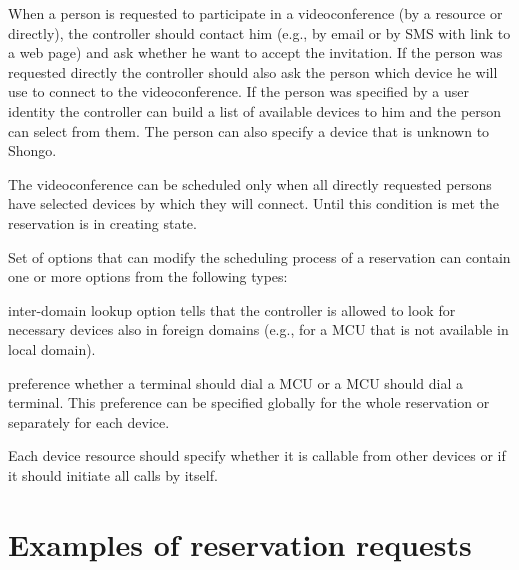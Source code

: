 When a person is requested to participate in a videoconference (by a resource or directly), the controller should contact him (e.g., by email or by SMS with link to a web page) and ask whether he want to accept the invitation. If the person was requested directly the controller should also ask the person which device he will use to connect to the videoconference. If the person was specified by a user identity the controller can build a list of available devices to him and the person can select from them. The person can also specify a device that is unknown to Shongo. 

The videoconference can be scheduled only when all directly requested persons have selected devices by which they will connect. Until this condition is met the reservation is in creating state.

Set of options that can modify the scheduling process of a reservation can contain one or more options from the following types:
\begin{compactitem}
\item inter-domain lookup option tells that the controller is allowed to look for necessary devices also in foreign domains (e.g., for a MCU that is not available in local domain).
\item preference whether a terminal should dial a MCU or a MCU should dial a terminal. This preference can be specified globally for the whole reservation or separately for each device.
\end{compactitem}
Each device resource should specify whether it is callable from other devices or if it should initiate all calls by itself.

\section{Examples of reservation requests}

\CodeStyleAppendImplementation
\CodeStyleAppendEnum

